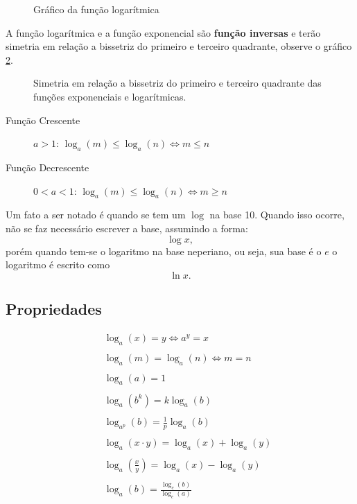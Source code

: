 \begin{figure}[ht]
   \centering
   \caption{Gráfico da função logarítmica}
   \label{fig:graf-log}
\end{figure}

A função logarítmica e a função exponencial são \textbf{função inversas} e terão simetria em relação a bissetriz do primeiro e terceiro quadrante, observe o gráfico \ref{fig:sim-log}.

\begin{figure}[ht]
    \centering
   \caption{Simetria em relação a bissetriz do primeiro e terceiro quadrante das funções exponenciais e logarítmicas.}
   \label{fig:sim-log}
\end{figure}

\begin{description}
	\item [Função Crescente] $a > 1$: $\log_a(m) \leq \log_a(n) \iff m \leq n$
	\item [Função Decrescente] $0 < a < 1$: $\log_a(m) \leq \log_a(n) \iff m \geq n$
\end{description}

Um fato a ser notado é quando se tem um $\log$ na base 10. Quando isso ocorre, não se faz necessário escrever a base, assumindo a forma: \[
	\log x
,\] porém quando tem-se o logaritmo na base neperiano, ou seja, sua base é o $e$ o logaritmo é escrito como
 \[
	\ln x
.\] 

\subsection{Propriedades}

\begin{eqnarray*}
	&&\log_a(x) = y \iff a^{y} = x \\
	\\
	&&\log_a(m) = \log_a(n) \iff m = n \\
	\\
	&&\log_a(a) = 1 \\
	\\
	&&\log_a(b^{k}) = k\log_a(b) \\
	\\
	&&\log_{a^{p}}(b) = \frac{1}{p}\log_a(b) \\
	\\
	&&\log_a(x\cdot y) = \log_a(x) + \log_a(y) \\
	\\
	&&\log_a\left(\frac{x}{y}\right) = \log_a(x) - \log_a(y) \\
	\\
	&&\log_a(b) = \frac{\log_c(b)}{\log_c(a)}
\end{eqnarray*}
